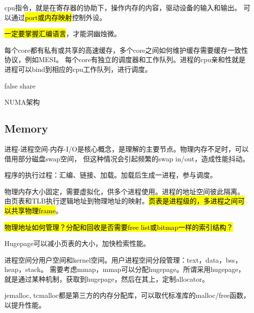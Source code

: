 cpu指令，就是在寄存器的协助下，操作内存的内容，驱动设备的输入和输出。
可以通过\hl{port或内存映射}控制外设。

\hl{一定要掌握汇编语言}，才能洞幽烛微。

每个core都有私有或共享的高速缓存，多个core之间如何维护缓存需要缓存一致性协议，例如MESI。
每个core有独立的调度器和工作队列。进程的cpu亲和性就是进程可以bind到相应的cpu工作队列，进行调度。

false share

NUMA架构

\subsection{Memory}

进程-进程空间-内存-I/O是核心概念，是理解的主要节点。物理内存不足时，可以借用部分磁盘swap空间，
但这种情况会引起频繁的swap in/out，造成性能抖动。

程序的执行过程：汇编、链接、加载。加载后生成一进程，参与调度。

物理内存大小固定，需要虚拟化，供多个进程使用。进程的地址空间彼此隔离。
由页表和TLB执行逻辑地址到物理地址的映射。\hl{页表是进程级的，多进程之间可以共享物理frame}。

\hl{物理地址如何管理？分配和回收是否需要free list或bitmap一样的索引结构？}

Hugepage可以减小页表的大小，加快检索性能。

进程空间分用户空间和kernel空间。用户进程空间分段管理：text，data，bss，heap，stack。
需要考虑mmap，mmap可以分配hugepage。所谓采用hugepage，就是通过某种机制，获取到hugepage，然后在其上，定制allocator。

jemalloc, tcmalloc都是第三方的内存分配库，可以取代标准库的malloc/free函数，以提升性能。
